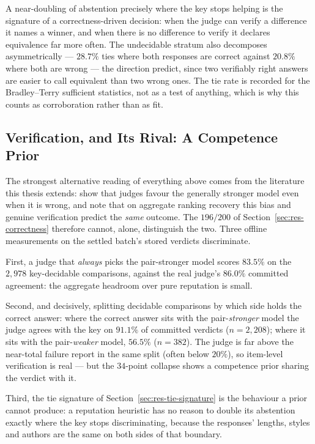 A near-doubling of abstention precisely where the key stops helping is
the signature of a correctness-driven decision: when the judge can
verify a difference it names a winner, and when there is no difference
to verify it declares equivalence far more often. The undecidable
stratum also decomposes asymmetrically --- $28.7\%$ ties where both
responses are correct against $20.8\%$ where both are wrong --- the
direction \textcite{stephan2024calculation} predict, since two
verifiably right answers are easier to call equivalent than two
wrong ones. The tie rate is
recorded for the Bradley--Terry sufficient statistics, not as a test of
anything, which is why this counts as corroboration rather than as
fit.


\subsection{Verification, and Its Rival: A Competence Prior}\label{sec:res-competence}

The strongest alternative reading of everything above comes from the
literature this thesis extends: \textcite{stephan2024calculation} show
that judges favour the generally stronger model even when it is wrong,
and note that on aggregate ranking recovery this bias and genuine
verification predict the \emph{same} outcome. The $196/200$ of
Section~\ref{sec:res-correctness} therefore cannot, alone, distinguish
the two. Three offline measurements on the settled batch's stored
verdicts discriminate.

First, a judge that \emph{always} picks the pair-stronger model scores
$83.5\%$ on the $2{,}978$ key-decidable comparisons, against the real
judge's $86.0\%$ committed agreement: the aggregate headroom over pure
reputation is small.

Second, and decisively, splitting decidable comparisons by which side
holds the correct answer: where the correct answer sits with the
pair-\emph{stronger} model the judge agrees with the key on $91.1\%$
of committed verdicts ($n = 2{,}208$); where it sits with the
pair-\emph{weaker} model, $56.5\%$ ($n = 382$). The judge is far above
the near-total failure \textcite{stephan2024calculation} report in the
same split (often below $20\%$), so item-level verification is real
--- but the $34$-point collapse shows a competence prior sharing the
verdict with it.

Third, the tie signature of Section~\ref{sec:res-tie-signature} is the
behaviour a prior cannot produce: a reputation heuristic has no reason
to double its abstention exactly where the key stops discriminating,
because the responses' lengths, styles and authors are the same on
both sides of that boundary.

